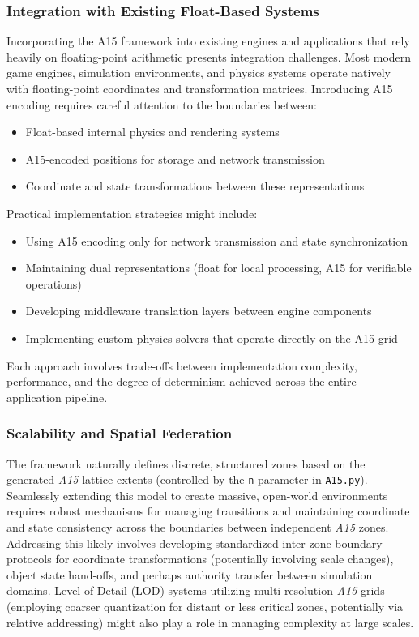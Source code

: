 \documentclass[10pt]{article}
\def\AAAB{\textit{A15}}
\begin{document}
\subsubsection{Integration with Existing Float-Based Systems}\label{subsubsec-limits-integration}
Incorporating the A15 framework into existing engines and applications that rely heavily on floating-point arithmetic presents integration challenges. Most modern game engines, simulation environments, and physics systems operate natively with floating-point coordinates and transformation matrices. Introducing A15 encoding requires careful attention to the boundaries between:

\begin{itemize}\itemsep0pt
    \item Float-based internal physics and rendering systems
    \item A15-encoded positions for storage and network transmission
    \item Coordinate and state transformations between these representations
\end{itemize}

Practical implementation strategies might include:
\begin{itemize}\itemsep0pt
    \item Using A15 encoding only for network transmission and state synchronization
    \item Maintaining dual representations (float for local processing, A15 for verifiable operations)
    \item Developing middleware translation layers between engine components
    \item Implementing custom physics solvers that operate directly on the A15 grid
\end{itemize}

Each approach involves trade-offs between implementation complexity, performance, and the degree of determinism achieved across the entire application pipeline.

\subsubsection{Scalability and Spatial Federation}\label{subsubsec-limits-federation}
The framework naturally defines discrete, structured zones based on the generated \AAAB{} lattice extents (controlled by the \texttt{n} parameter in \texttt{A15.py}). Seamlessly extending this model to create massive, open-world environments requires robust mechanisms for managing transitions and maintaining coordinate and state consistency across the boundaries between independent \AAAB{} zones. Addressing this likely involves developing standardized inter-zone boundary protocols for coordinate transformations (potentially involving scale changes), object state hand-offs, and perhaps authority transfer between simulation domains. Level-of-Detail (LOD) systems \cite{Luebke2002} utilizing multi-resolution \AAAB{} grids (employing coarser quantization for distant or less critical zones, potentially via relative addressing) might also play a role in managing complexity at large scales.
\end{document}
